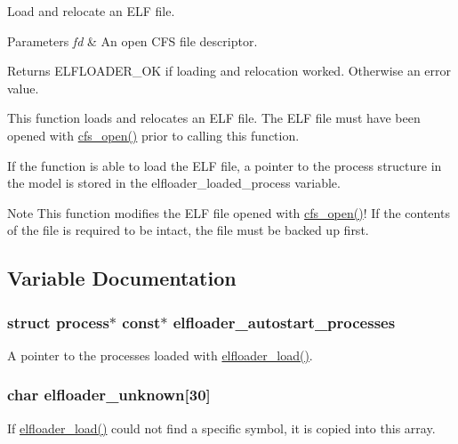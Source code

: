 Load and relocate an E\+L\+F file. 


\begin{DoxyParams}{Parameters}
{\em fd} & An open C\+F\+S file descriptor. \\
\hline
\end{DoxyParams}
\begin{DoxyReturn}{Returns}
E\+L\+F\+L\+O\+A\+D\+E\+R\+\_\+\+O\+K if loading and relocation worked. Otherwise an error value.
\end{DoxyReturn}
This function loads and relocates an E\+L\+F file. The E\+L\+F file must have been opened with \hyperlink{group__cfs_gadc1727a1a27a40a8483135425a42c5de}{cfs\+\_\+open()} prior to calling this function.

If the function is able to load the E\+L\+F file, a pointer to the process structure in the model is stored in the elfloader\+\_\+loaded\+\_\+process variable.

\begin{DoxyNote}{Note}
This function modifies the E\+L\+F file opened with \hyperlink{group__cfs_gadc1727a1a27a40a8483135425a42c5de}{cfs\+\_\+open()}! If the contents of the file is required to be intact, the file must be backed up first. 
\end{DoxyNote}


\subsection{Variable Documentation}
\hypertarget{group__elfloader_ga9f2016bded2b94bde0fd29bf260aecd1}{}
\subsubsection[{elfloader\+\_\+autostart\+\_\+processes}]{\setlength{\rightskip}{0pt plus 5cm}struct process$\ast$ const$\ast$ elfloader\+\_\+autostart\+\_\+processes}\label{group__elfloader_ga9f2016bded2b94bde0fd29bf260aecd1}
A pointer to the processes loaded with \hyperlink{group__elfloader_ga57190d49fcc860d9a780f2860e896a5b}{elfloader\+\_\+load()}. \hypertarget{group__elfloader_gaf087e757d08d26af687c22380a039d75}{}
\subsubsection[{elfloader\+\_\+unknown}]{\setlength{\rightskip}{0pt plus 5cm}char elfloader\+\_\+unknown\mbox{[}30\mbox{]}}\label{group__elfloader_gaf087e757d08d26af687c22380a039d75}
If \hyperlink{group__elfloader_ga57190d49fcc860d9a780f2860e896a5b}{elfloader\+\_\+load()} could not find a specific symbol, it is copied into this array. 